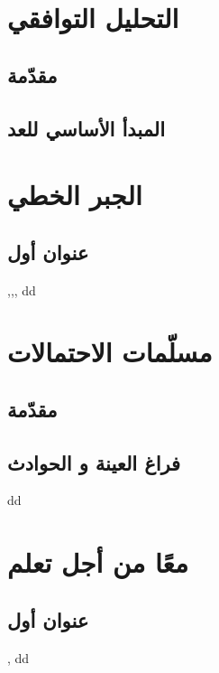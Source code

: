 \documentclass[12pt,openany]{walidex}
\begin{document}
\pagestyle{IHA-fancy-style} 
 \DeactivateBG
 \dominitoc
\tableofcontents
\newpage 

\ActivateBG 
 
\chapter{التحليل التوافقي}
\hypertarget{sec:0}{}
\printmyminitoc

\section{مقدّمة}
\section{المبدأ الأساسي للعد}
\lipsum[1-16]
 
\chapter{الجبر الخطي}
\hypertarget{sec:1}{}
\printmyminitoc

\section{عنوان أول}
 ,,,
\newpage
dd
\chapter{مسلّمات الاحتمالات}
 \hypertarget{sec:2}{}
\printmyminitoc
\section{مقدّمة}
\section{فراغ العينة و الحوادث} 
\newpage
dd
\chapter{معًا من أجل تعلم  }
 \hypertarget{sec:3}{}
 \printmyminitoc
\section{عنوان أول}
,
\newpage
dd
\end{document}
